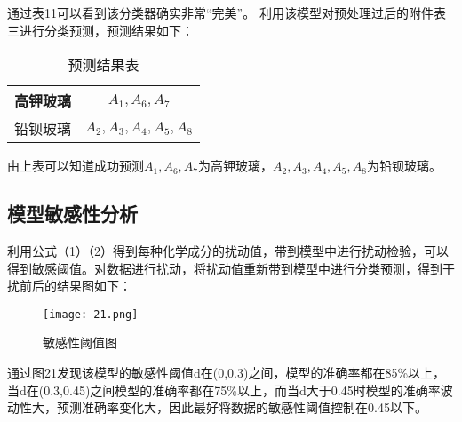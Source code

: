 通过表11可以看到该分类器确实非常“完美”。
利用该模型对预处理过后的附件表三进行分类预测，预测结果如下：



\begin{table}[H]
	\centering
	\begin{tabular}{c c} 
		\toprule[1.5pt]
		高钾玻璃 & $A_1,A_6,A_7$ \\
		\midrule[1pt]
		铅钡玻璃 & $A_2,A_3,A_4,A_5,A_8$ \\
		\toprule[1.5pt]
	\end{tabular}
\caption{预测结果表}
\end{table}

由上表可以知道成功预测$A_1,A_6,A_7$为高钾玻璃，$A_2,A_3,A_4,A_5,A_8$为铅钡玻璃。


\subsection{模型敏感性分析}

利用公式（1）（2）得到每种化学成分的扰动值，带到模型中进行扰动检验，可以得到敏感阈值。对数据进行扰动，将扰动值重新带到模型中进行分类预测，得到干扰前后的结果图如下：


\begin{figure}[H] 
	\centering %
	\texttt{[image: 21.png]} %
	\caption{敏感性阈值图} %
	\label{Fig.main22} %
\end{figure}

通过图21发现该模型的敏感性阈值d在(0,0.3)之间，模型的准确率都在85\%以上，当d在(0.3,0.45)之间模型的准确率都在75\%以上，而当d大于0.45时模型的准确率波动性大，预测准确率变化大，因此最好将数据的敏感性阈值控制在0.45以下。